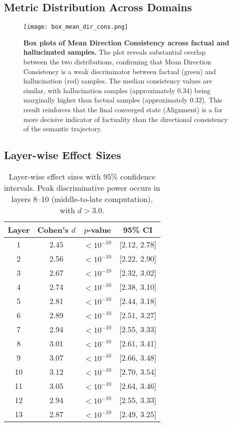 \documentclass[11pt]{article}
\begin{document}
\subsection{Metric Distribution Across Domains}

\begin{figure}[h]
\centering
\texttt{[image: box\_mean\_dir\_cons.png]}
\caption{\textbf{Box plots of Mean Direction Consistency across factual and hallucinated samples.}
The plot reveals substantial overlap between the two distributions, confirming that Mean Direction Consistency is a weak discriminator between factual (green) and hallucination (red) samples.
The median consistency values are similar, with hallucination samples (approximately $0.34$) being marginally higher than factual samples (approximately $0.32$).
This result reinforces that the final converged state (Alignment) is a far more decisive indicator of factuality than the directional consistency of the semantic trajectory.}

\label{fig:domain_distributions}
\end{figure}

\subsection{Layer-wise Effect Sizes}

\begin{table}[h]
\centering
\small
\begin{tabular}{cccc}
\toprule
\textbf{Layer} & \textbf{Cohen's $d$} & \textbf{$p$-value} & \textbf{95\% CI} \\
\midrule
1 & 2.45 & $< 10^{-10}$ & [2.12, 2.78] \\
2 & 2.56 & $< 10^{-10}$ & [2.22, 2.90] \\
3 & 2.67 & $< 10^{-10}$ & [2.32, 3.02] \\
4 & 2.74 & $< 10^{-10}$ & [2.38, 3.10] \\
5 & 2.81 & $< 10^{-10}$ & [2.44, 3.18] \\
6 & 2.89 & $< 10^{-10}$ & [2.51, 3.27] \\
7 & 2.94 & $< 10^{-10}$ & [2.55, 3.33] \\
8 & 3.01 & $< 10^{-10}$ & [2.61, 3.41] \\
9 & 3.07 & $< 10^{-10}$ & [2.66, 3.48] \\
10 & 3.12 & $< 10^{-10}$ & [2.70, 3.54] \\
11 & 3.05 & $< 10^{-10}$ & [2.64, 3.46] \\
12 & 2.94 & $< 10^{-10}$ & [2.55, 3.33] \\
13 & 2.87 & $< 10^{-10}$ & [2.49, 3.25] \\
\bottomrule
\end{tabular}
\caption{Layer-wise effect sizes with 95\% confidence intervals. Peak discriminative power occurs in layers 8--10 (middle-to-late computation), with $d > 3.0$.}
\end{table}
\end{document}
